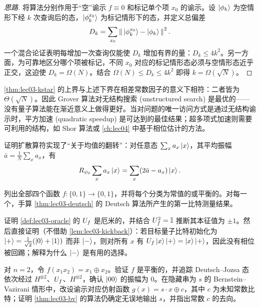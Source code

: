 \begin{proof}[思路]
将算法分别作用于“空”谕示 $f\equiv0$ 和标记单个项 $x_0$ 的谕示。设 $\ket{\phi_k}$ 为空情形下经 $k$ 次查询后的态，$\ket{\phi_k^{x_0}}$ 为标记情形下的态，并定义总偏差
\[
  D_k=\sum_{x_0}\left\lVert \,\ket{\phi_k^{x_0}}-\ket{\phi_k}\, \right\rVert^{2}.
\]
一个混合论证表明每增加一次查询仅能使 $D_k$ 增加有界的量：$D_k\le 4k^{2}$。另一方面，为可靠地区分哪个项被标记，不同 $x_0$ 对应的标记情形态必须与空情形态近乎正交，这迫使 $D_k=\Omega(N)$。结合
$\Omega(N)\le D_k\le 4k^{2}$ 即得 $k=\Omega(\sqrt N)$。
\end{proof}

\begin{remark}
\label{rem:lec03-optimal}
\cref{thm:lec03-kstar} 的上界与上述下界在相差常数因子的意义下相符：二者皆为 $\Theta(\sqrt N)$。因此 Grover 算法对无结构搜索 (unstructured search) 是最优的——没有量子算法能在渐近意义上做得更好。当对问题的唯一访问方式是通过无结构谕示时，平方加速 (quadratic speedup) 是可达到的最佳结果；超多项式加速则需要可利用的结构，如 Shor 算法或 \cref{ch:lec04} 中基于相位估计的方法。
\end{remark}

\exercisesection
\begin{exercise}\label{ex:lec03-1}
证明扩散算符实现了“关于均值的翻转”：对任意态 $\sum_x a_x\ket{x}$，其平均振幅 $\bar a=\tfrac1N\sum_x a_x$，有
\[
  R_{\psi_0}\sum_x a_x\ket{x}=\sum_x(2\bar a-a_x)\ket{x}.
\]
\end{exercise}

\begin{exercise}\label{ex:lec03-2}
列出全部四个函数 $f:\{0,1\}\to\{0,1\}$，并将每个分类为常值的或平衡的。对每一个，手算 \cref{thm:lec03-deutsch} 的 Deutsch 算法所产生的第一比特测量结果。
\end{exercise}

\begin{exercise}\label{ex:lec03-3}
证明 \cref{def:lec03-oracle} 的 $U_{f}$ 是厄米的，并结合 $U_{f}^2=\mathbb{I}$ 推断其本征值为 $\pm1$。然后直接证明（不借助 \cref{lem:lec03-kickback}）：若目标量子比特初始化为 $\ket{+}=\tfrac{1}{\sqrt2}(\ket0+\ket1)$ 而非 $\ket{-}$，则对所有 $x$ 有 $U_{f}\ket{x}\ket{+}=\ket{x}\ket{+}$，因此没有相位被回踢；解释为什么 $\ket{-}$ 是有用的选择。
\end{exercise}

\begin{exercise}\label{ex:lec03-4}
对 $n=2$，令 $f(x_1x_2)=x_1\oplus x_2$。验证 $f$ 是平衡的，并追踪 Deutsch--Jozsa 态依次经过 $H^{\otimes 2}$、$U_{f}$、$H^{\otimes 2}$，确认 $\ket{00}$ 的振幅为 $0$。在隐藏串为 $s$ 的 Bernstein--Vazirani 情形中，改设谕示对应仿射函数 $g(x)=s\cdot x\oplus c$，其中 $c$ 为未知常数比特；证明 \cref{thm:lec03-bv} 的算法仍确定无误地输出 $s$，并指出常数 $c$ 的去向。
\end{exercise}

